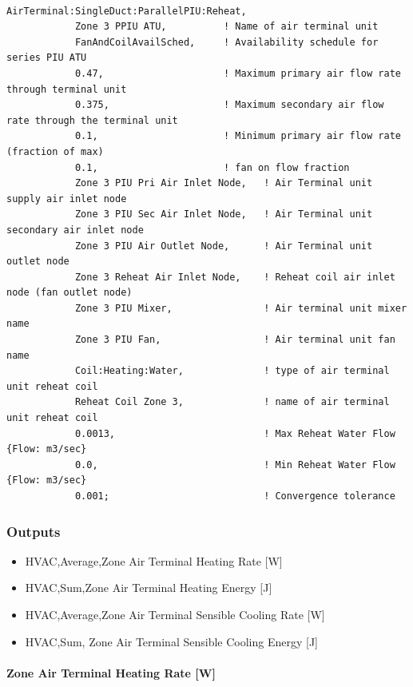 \begin{lstlisting}

AirTerminal:SingleDuct:ParallelPIU:Reheat,
            Zone 3 PPIU ATU,          ! Name of air terminal unit
            FanAndCoilAvailSched,     ! Availability schedule for series PIU ATU
            0.47,                     ! Maximum primary air flow rate through terminal unit
            0.375,                    ! Maximum secondary air flow rate through the terminal unit
            0.1,                      ! Minimum primary air flow rate (fraction of max)
            0.1,                      ! fan on flow fraction
            Zone 3 PIU Pri Air Inlet Node,   ! Air Terminal unit supply air inlet node
            Zone 3 PIU Sec Air Inlet Node,   ! Air Terminal unit secondary air inlet node
            Zone 3 PIU Air Outlet Node,      ! Air Terminal unit outlet node
            Zone 3 Reheat Air Inlet Node,    ! Reheat coil air inlet node (fan outlet node)
            Zone 3 PIU Mixer,                ! Air terminal unit mixer name
            Zone 3 PIU Fan,                  ! Air terminal unit fan name
            Coil:Heating:Water,              ! type of air terminal unit reheat coil
            Reheat Coil Zone 3,              ! name of air terminal unit reheat coil
            0.0013,                          ! Max Reheat Water Flow {Flow: m3/sec}
            0.0,                             ! Min Reheat Water Flow {Flow: m3/sec}
            0.001;                           ! Convergence tolerance
\end{lstlisting}

\subsubsection{Outputs}\label{outputs-8}

\begin{itemize}
\item
  HVAC,Average,Zone Air Terminal Heating Rate {[}W{]}
\item
  HVAC,Sum,Zone Air Terminal Heating Energy {[}J{]}
\item
  HVAC,Average,Zone Air Terminal Sensible Cooling Rate {[}W{]}
\item
  HVAC,Sum, Zone Air Terminal Sensible Cooling Energy {[}J{]}
\end{itemize}

\paragraph{Zone Air Terminal Heating Rate {[}W{]}}\label{zone-air-terminal-heating-rate-w-1}

